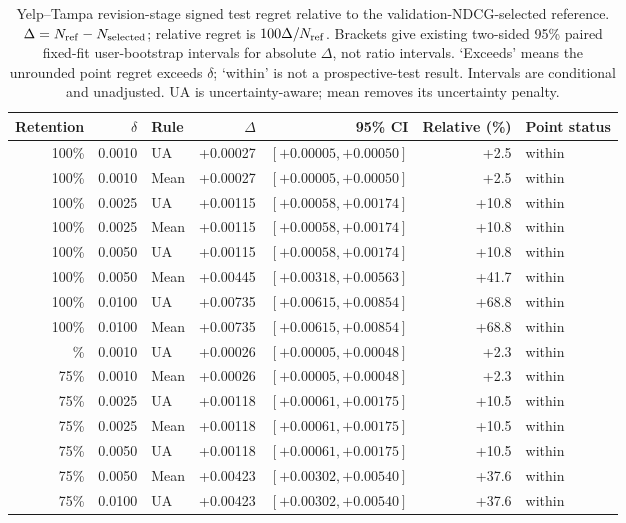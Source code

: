 \begin{table}[H]
\centering
\caption{Yelp--Tampa revision-stage signed test regret relative to the validation-NDCG-selected reference. $\Delta=N_{\rm ref}-N_{\rm selected}$; relative regret is $100\Delta/N_{\rm ref}$. Brackets give existing two-sided 95\% paired fixed-fit user-bootstrap intervals for absolute $\Delta$, not ratio intervals. `Exceeds' means the unrounded point regret exceeds $\delta$; `within' is not a prospective-test result. Intervals are conditional and unadjusted. UA is uncertainty-aware; mean removes its uncertainty penalty.}
\label{tab:coverage-regret-yelp-tampa-restaurants}
\small
\setlength{\tabcolsep}{4pt}
\begin{tabular}{@{}rrlrrrl@{}}
\toprule
Retention & $\delta$ & Rule & $\Delta$ & 95\% CI & Relative (\%) & Point status \\
\midrule
100\% & 0.0010 & UA & +0.00027 & $[+0.00005, +0.00050]$ & +2.5 & within \\
100\% & 0.0010 & Mean & +0.00027 & $[+0.00005, +0.00050]$ & +2.5 & within \\
100\% & 0.0025 & UA & +0.00115 & $[+0.00058, +0.00174]$ & +10.8 & within \\
100\% & 0.0025 & Mean & +0.00115 & $[+0.00058, +0.00174]$ & +10.8 & within \\
100\% & 0.0050 & UA & +0.00115 & $[+0.00058, +0.00174]$ & +10.8 & within \\
100\% & 0.0050 & Mean & +0.00445 & $[+0.00318, +0.00563]$ & +41.7 & within \\
100\% & 0.0100 & UA & +0.00735 & $[+0.00615, +0.00854]$ & +68.8 & within \\
100\% & 0.0100 & Mean & +0.00735 & $[+0.00615, +0.00854]$ & +68.8 & within \\
\addlinespace
75\% & 0.0010 & UA & +0.00026 & $[+0.00005, +0.00048]$ & +2.3 & within \\
75\% & 0.0010 & Mean & +0.00026 & $[+0.00005, +0.00048]$ & +2.3 & within \\
75\% & 0.0025 & UA & +0.00118 & $[+0.00061, +0.00175]$ & +10.5 & within \\
75\% & 0.0025 & Mean & +0.00118 & $[+0.00061, +0.00175]$ & +10.5 & within \\
75\% & 0.0050 & UA & +0.00118 & $[+0.00061, +0.00175]$ & +10.5 & within \\
75\% & 0.0050 & Mean & +0.00423 & $[+0.00302, +0.00540]$ & +37.6 & within \\
75\% & 0.0100 & UA & +0.00423 & $[+0.00302, +0.00540]$ & +37.6 & within \\

\end{tabular}
\end{table}
